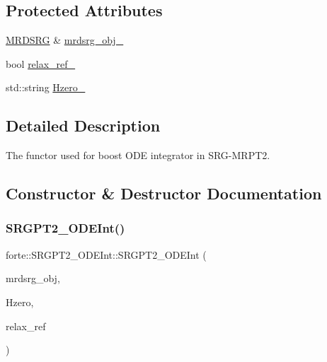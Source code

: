\subsection*{Protected Attributes}
\begin{DoxyCompactItemize}
\item 
\mbox{\hyperlink{classforte_1_1_m_r_d_s_r_g}{M\+R\+D\+S\+RG}} \& \mbox{\hyperlink{classforte_1_1_s_r_g_p_t2___o_d_e_int_a5fca2a6e3823f186125ee1e6f110ce2b}{mrdsrg\+\_\+obj\+\_\+}}
\item 
bool \mbox{\hyperlink{classforte_1_1_s_r_g_p_t2___o_d_e_int_a53b24bd932c31ebbaf6aa956d14b70c7}{relax\+\_\+ref\+\_\+}}
\item 
std\+::string \mbox{\hyperlink{classforte_1_1_s_r_g_p_t2___o_d_e_int_af5b6d5d350fd04a1f8312e31a828e828}{Hzero\+\_\+}}
\end{DoxyCompactItemize}


\subsection{Detailed Description}
The functor used for boost O\+DE integrator in S\+R\+G-\/\+M\+R\+P\+T2. 

\subsection{Constructor \& Destructor Documentation}
\mbox{\label{classforte_1_1_s_r_g_p_t2___o_d_e_int_a0dec9b83e1c41b1ce3760292b7fda0e3}} 
\subsubsection{\texorpdfstring{S\+R\+G\+P\+T2\+\_\+\+O\+D\+E\+Int()}{SRGPT2\_ODEInt()}}
{\footnotesize\ttfamily forte\+::\+S\+R\+G\+P\+T2\+\_\+\+O\+D\+E\+Int\+::\+S\+R\+G\+P\+T2\+\_\+\+O\+D\+E\+Int (\begin{DoxyParamCaption}\item[{\mbox{\hyperlink{classforte_1_1_m_r_d_s_r_g}{M\+R\+D\+S\+RG}} \&}]{mrdsrg\+\_\+obj,  }\item[{std\+::string}]{Hzero,  }\item[{bool}]{relax\+\_\+ref }\end{DoxyParamCaption})\hspace{0.3cm}{\ttfamily [inline]}}



